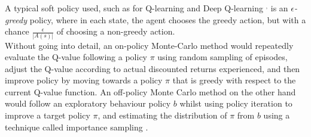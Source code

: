 \documentclass[12pt]{article}
\begin{document}
A typical soft policy used, such as for Q-learning \autocite{watkins1992q} and Deep Q-learning \autocite{Mnih2015}$^,$ \autocite{DBLP:journals/corr/MnihKSGAWR13} is an $\epsilon$\textit{-greedy} policy, where in each state, the agent chooses the greedy action, but with a chance $\frac{\epsilon}{|A(s)|}$ of choosing a non-greedy action. 
\\\newline Without going into detail, an on-policy Monte-Carlo method would repeatedly evaluate the Q-value following a policy $\pi$ using random sampling of episodes, adjust the Q-value according to actual discounted returns experienced, and then improve policy by moving towards a policy $\pi$ that is greedy with respect to the current Q-value function. An off-policy Monte Carlo method on the other hand would follow an exploratory behaviour policy $b$ whilst using policy iteration to improve a target policy $\pi$, and estimating the distribution of $\pi$ from $b$ using a technique called importance sampling \autocite{rlintrochap5,rubinstein2011simulation}.
\end{document}
